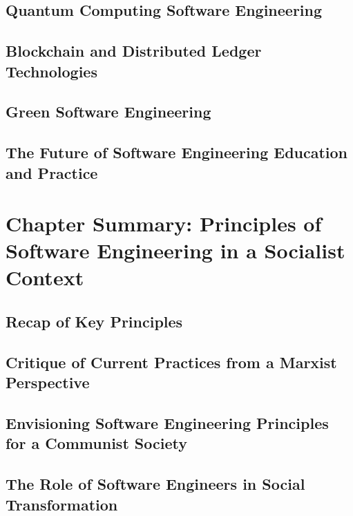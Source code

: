 \subsection{Quantum Computing Software Engineering}
\subsection{Blockchain and Distributed Ledger Technologies}
\subsection{Green Software Engineering}
\subsection{The Future of Software Engineering Education and Practice}

\newpage

\section{Chapter Summary: Principles of Software Engineering in a Socialist Context}
\subsection{Recap of Key Principles}
\subsection{Critique of Current Practices from a Marxist Perspective}
\subsection{Envisioning Software Engineering Principles for a Communist Society}
\subsection{The Role of Software Engineers in Social Transformation}